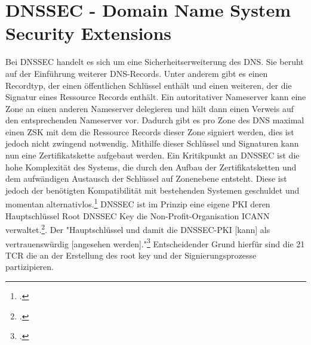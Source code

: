 \documentclass  [paper=a4,
				fontsize=12pt,
				listof=totoc,
				bibliography=totoc
				]{scrreprt}
\begin{document}
		\section{DNSSEC - Domain Name System Security Extensions}
		\label{sec:dnssec}
			Bei \ac{DNSSEC} handelt es sich um eine Sicherheitserweiterung des \ac{DNS}.
			Sie beruht auf der Einführung weiterer \ac{DNS}-Records.
			Unter anderem gibt es einen Recordtyp, der einen öffentlichen Schlüssel enthält und einen weiteren, der die Signatur eines Ressource Records enthält.
			Ein autoritativer Nameserver kann eine Zone an einen anderen Nameserver delegieren und hält dann einen Verweis auf den entsprechenden Nameserver vor.
			Dadurch gibt es pro Zone des \ac{DNS} maximal einen \ac{ZSK} mit dem die Ressource Records dieser Zone signiert werden, dies ist jedoch nicht zwingend notwendig.
			Mithilfe dieser Schlüssel und Signaturen kann nun eine Zertifikatskette aufgebaut werden.
			Ein Kritikpunkt an \ac{DNSSEC} ist die hohe Komplexität des Systems, die durch den Aufbau der Zertifikatsketten und dem aufwändigen Austausch der Schlüssel auf Zonenebene entsteht.
			Diese ist jedoch der benötigten Kompatibilität mit bestehenden Systemen geschuldet und momentan alternativlos.\footcite[Vgl.][S. 195]{Sorge2013}
			\ac{DNSSEC} ist im Prinzip eine eigene \ac{PKI} deren Hauptschlüssel Root DNSSEC Key die Non-Profit-Organisation \ac{ICANN} verwaltet.\footcite{Koetter2014}. Der "Hauptschlüssel und damit die \ac{DNSSEC}-\ac{PKI} [kann] als vertrauenswürdig [angesehen werden]."\footcite{Koetter2014} Entscheidender Grund hierfür sind die 21 \ac{TCR} die an der Erstellung des root key und der Signierungsprozesse partizipieren.
	
\end{document}
